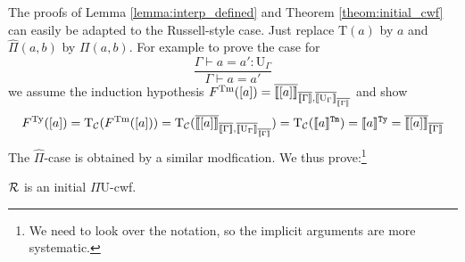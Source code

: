 \documentclass{lmcs}
\def\UU{\mathrm{U}}
\def\Ta{\mathrm{T}}
\def\Pihat{\hat{\Pi}}
\newcommand{\intTyU}[1]{\llbracket #1 \rrbracket^\RawTy}
\newcommand{\intTmU}[1]{\llbracket #1 \rrbracket^\RawTm}
\begin{document}
The proofs of Lemma \ref{lemma:interp_defined} and Theorem \ref{theom:initial_cwf} can easily be adapted to the Russell-style case. Just replace $\Ta(a)$ by $a$ and $\Pihat(a,b)$ by $\Pi(a,b)$.
For example to prove the case for
$$
\frac{\Gamma \vdash a = a' : \UU_\Gamma}
{\Gamma \vdash a = a' }
$$
we assume the induction hypothesis 
 $F^\Tm([a]) = \iniTm{\iniCtx{\Gamma}}{\iniTy{\iniCtx{\Gamma}}{\UU_\Gamma}}{[a]}$
and show
$$
F^\Ty([a]) = \Ta_\C(F^\Tm([a])) = \Ta_\C(\iniTm{\iniCtx{\Gamma}}{\iniTy{\iniCtx{\Gamma}}{\UU_\Gamma}}{[a]}) = \Ta_\C(\intTmU{a}) = \intTyU{a} = \iniTy{\iniCtx{\Gamma}}{[a]}
$$
%
%
%
%
The $\Pihat$-case is obtained by a similar modfication. We thus prove:\footnote{We need to look over the notation, so the implicit arguments are more systematic.}

\begin{thm}\label{theom:initial_cwf}
  $\mathcal{R}$ is an initial $\Pi\UU$-cwf.
\end{thm}




\end{document}
